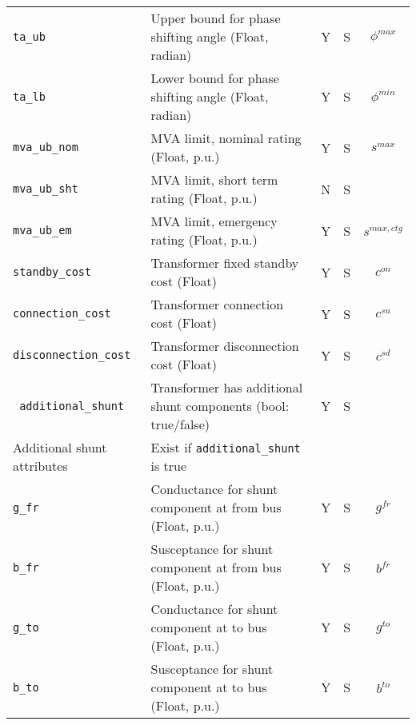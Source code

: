 \documentclass{article}
\begin{document}
\begin{center}
\begin{tabular}{ l | l | c | c | c |}
  {\tt ta\_ub} & Upper bound for phase shifting angle (Float, radian)& Y & S & $\phi^{max}$\\
  {\tt ta\_lb} & Lower bound for phase shifting angle (Float, radian)& Y & S & $\phi^{min}$\\
  {\tt mva\_ub\_nom} & MVA limit, nominal rating (Float, p.u.) & Y & S & $s^{max}$ \\
  {\tt mva\_ub\_sht} & MVA limit, short term rating (Float, p.u.) & N & S &  \\
  {\tt mva\_ub\_em} & MVA limit, emergency rating (Float, p.u.) & Y & S & $s^{max,ctg}$ \\
 
  {\tt standby\_cost} & Transformer fixed standby cost (Float) & Y & S & $c^{on}$\\
  {\tt connection\_cost} &  Transformer connection cost (Float) & Y & S & $c^{su}$\\      
  {\tt disconnection\_cost} & Transformer disconnection cost (Float) & Y & S & $c^{sd}$\\  
  {\tt\color{red} additional\_shunt} & Transformer has additional shunt components (bool: true/false)& Y & S & \\
  \hline    
  Additional shunt attributes & Exist if {\tt additional\_shunt} is true &  & & \\
  \hline
  {\tt g\_fr} & Conductance for shunt component at from bus (Float, p.u.)& Y & S & $g^{fr}$\\
  {\tt b\_fr} & Susceptance for shunt component at from bus (Float, p.u.)& Y & S & $b^{fr}$\\
  {\tt g\_to} & Conductance for shunt component at to bus (Float, p.u.)& Y & S & $g^{to}$\\
  {\tt b\_to} & Susceptance for shunt component at to bus (Float, p.u.)& Y & S & $b^{to}$\\
  \hline
\end{tabular}
\end{center}
\end{document}
